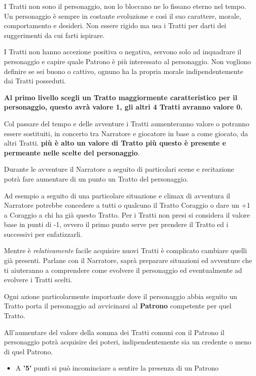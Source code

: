 \documentclass[a4paper,twoside,openany]{book}
\begin{document}
\begin{multicols}{2}
	\begin{giocatore}
		I Tratti non sono il personaggio, non lo bloccano ne lo fissano eterno nel tempo. Un personaggio è sempre in costante evoluzione e così il suo carattere, morale, comportamento e desideri. Non essere rigido ma usa i Tratti per darti dei suggerimenti da cui farti ispirare.
	\end{giocatore}

	I Tratti non hanno accezione positiva o negativa, servono solo ad inquadrare il personaggio e capire quale Patrono è più interessato al personaggio. Non vogliono definire se sei buono o cattivo, ognuno ha la propria morale indipendentemente dai Tratti posseduti.

	\textbf{Al primo livello scegli un Tratto maggiormente caratteristico per il personaggio, questo avrà valore 1, gli altri 4 Tratti avranno valore 0.}

	Col passare del tempo e delle avventure i Tratti aumenteranno valore o potranno essere sostituiti, in concerto tra Narratore e giocatore in base a come giocato, da altri Tratti. \textbf{più è alto un valore di Tratto più questo è presente e permeante nelle scelte del personaggio}.

	Durante le avventure il Narratore a seguito di particolari scene e recitazione potrà fare aumentare di un punto un Tratto del personaggio.

	Ad esempio a seguito di una particolare situazione e climax di avventura il Narratore potrebbe concedere a tutti o qualcuno il Tratto Coraggio o dare un +1 a Coraggio a chi ha già questo Tratto. Per i Tratti non presi si considera il valore base in punti di -1, ovvero il primo punto serve per prendere il Tratto ed i successivi per enfatizzarli.

	Mentre è \emph{relativamente} facile acquisire nuovi Tratti è complicato cambiare quelli già presenti. Parlane con il Narratore, saprà preparare situazioni ed avventure che ti aiuteranno a comprendere come evolvere il personaggio ed eventualmente ad evolvere i Tratti scelti.

	Ogni azione particolarmente importante dove il personaggio abbia seguito un Tratto porta il personaggio ad avvicinarsi al \textbf{Patrono} competente per quel Tratto.

	All'aumentare del valore della somma dei Tratti comuni con il Patrono il personaggio potrà acquisire dei poteri, indipendentemente sia un credente o meno di quel Patrono.

	\noindent\begin{itemize}[leftmargin=*] \setlength{\itemsep}{0pt}
		\item A \textbf{'5'} punti si può incominciare a sentire la presenza di un Patrono


\end{itemize}
\end{multicols}
\end{document}
